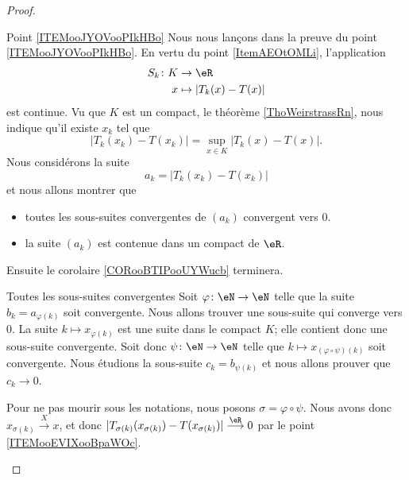 \begin{proof}
\begin{subproof}
		\item[Point \ref{ITEMooJYOVooPIkHBo}]
		Nous nous lançons dans la preuve du point \ref{ITEMooJYOVooPIkHBo}. En vertu du point \ref{ItemAEOtOMLi}, l'application
		\begin{equation}
			\begin{aligned}
				S_k\colon K & \to \eR                 \\
				x           & \mapsto | T_k(x)-T(x) |
			\end{aligned}
		\end{equation}
		est continue. Vu que \( K\) est un compact, le théorème \ref{ThoWeirstrassRn}, nous indique qu'il existe \( x_k\) tel que
		\begin{equation}
			| T_k(x_k)-T(x_k) |=\sup_{x\in K}| T_k(x)-T(x) |.
		\end{equation}
		Nous considérons la suite
		\begin{equation}
			a_k=| T_k(x_k)-T(x_k) |
		\end{equation}
		et nous allons montrer que
		\begin{itemize}
			\item toutes les sous-suites convergentes de \( (a_k)\) convergent vers \( 0\).
			\item la suite \( (a_k)\) est contenue dans un compact de \( \eR\).
		\end{itemize}
		Ensuite le corolaire \ref{CORooBTIPooUYWucb} terminera.
		\begin{subproof}

			\item[Toutes les sous-suites convergentes]
			Soit \( \varphi\colon \eN\to \eN\) telle que la suite \( b_k=a_{\varphi(k)}\) soit convergente. Nous allons trouver une sous-suite qui converge vers \( 0\).  La suite \( k\mapsto x_{\varphi(k)}\) est une suite dans le compact \( K\); elle contient donc une sous-suite convergente. Soit donc \( \psi\colon \eN\to \eN\) telle que \( k\mapsto x_{(\varphi\circ\psi)(k)}\) soit convergente. Nous étudions la sous-suite \( c_k=b_{\psi(k)}\) et nous allons prouver que \( c_k\to 0\).

			Pour ne pas mourir sous les notations, nous posons \( \sigma=\varphi\circ\psi\). Nous avons donc \( x_{\sigma(k)}\stackrel{X}{\longrightarrow}x\), et donc  \( | T_{\sigma(k)}(x_{\sigma(k)})-T(x_{\sigma(k)}) |\stackrel{\eR}{\longrightarrow}0\) par le point \ref{ITEMooEVIXooBpaWOc}.



\end{subproof}
\end{subproof}
\end{proof}
